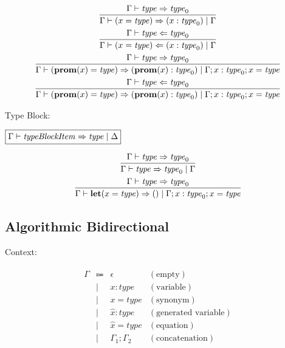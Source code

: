 \begin{gather*}
  \infer{\Gamma \vdash (x = \mathit{type}) \Rightarrow (x: \mathit{type}_0) \mid \Gamma}{
    \Gamma \vdash \mathit{type} \Rightarrow \mathit{type}_0
  }
  \\
  \infer{\Gamma \vdash (x = \mathit{type}) \Leftarrow (x: \mathit{type}_0) \mid \Gamma}{
    \Gamma \vdash \mathit{type} \Leftarrow \mathit{type}_0
  }
  \\
  \infer{\Gamma \vdash (\mathbf{prom}(x) = \mathit{type}) \Rightarrow (\mathbf{prom}(x): \mathit{type}_0) \mid \Gamma; x: \mathit{type}_0; x = \mathit{type}}{
    \Gamma \vdash \mathit{type} \Rightarrow \mathit{type}_0
  }
  \\
  \infer{\Gamma \vdash (\mathbf{prom}(x) = \mathit{type}) \Rightarrow (\mathbf{prom}(x): \mathit{type}_0) \mid \Gamma; x: \mathit{type}_0; x = \mathit{type}}{
    \Gamma \vdash \mathit{type} \Leftarrow \mathit{type}_0
  }
\end{gather*}

Type Block:

$\fbox{$\Gamma \vdash \mathit{typeBlockItem} \Rightarrow \mathit{type} \mid \Delta$}$

\begin{gather*}
  \infer{\Gamma \vdash \mathit{type} \Rightarrow \mathit{type}_0 \mid \Gamma}{
    \Gamma \vdash \mathit{type} \Rightarrow \mathit{type}_0
  }
  \\
  \infer{\Gamma \vdash \mathbf{let}(x = \mathit{type}) \Rightarrow () \mid \Gamma; x: \mathit{type}_0; x = \mathit{type}}{
    \Gamma \vdash \mathit{type} \Rightarrow \mathit{type}_0
  }
\end{gather*}

\subsection{Algorithmic Bidirectional}

Context:

\begin{align*}
  \begin{array}{rclr}
    \Gamma
    & \Coloneq & \epsilon &(\text{empty}) \\
    & \mid & x: \mathit{type} &(\text{variable}) \\
    & \mid & x = \mathit{type} &(\text{synonym}) \\
    & \mid & \hat{x}: \mathit{type} &(\text{generated variable}) \\
    & \mid & \hat{x} = \mathit{type} &(\text{equation}) \\
    & \mid & \Gamma_1; \Gamma_2 &(\text{concatenation})
  \end{array}
\end{align*}


